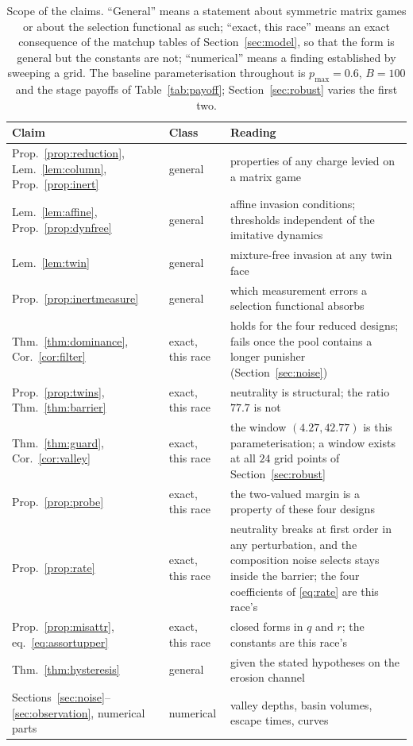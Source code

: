 \documentclass[pdflatex]{sn-jnl}
\theoremstyle{thmstyleone}
\theoremstyle{thmstylethree}
\theoremstyle{thmstyletwo}
\begin{document}
\begin{table}[!ht]
\centering
\caption{Scope of the claims. ``General'' means a statement about symmetric
matrix games or about the selection functional as such; ``exact, this race''
means an exact consequence of the matchup tables of Section~\ref{sec:model},
so that the form is general but the constants are not; ``numerical'' means a
finding established by sweeping a grid. The baseline parameterisation
throughout is $p_{\max}=0.6$, $B=100$ and the stage payoffs of
Table~\ref{tab:payoff}; Section~\ref{sec:robust} varies the first two.}
\label{tab:scope}
\begin{tabular}{llp{5.4cm}}
\toprule
Claim & Class & Reading \\
\midrule
Prop.~\ref{prop:reduction}, Lem.~\ref{lem:column}, Prop.~\ref{prop:inert}
  & general & properties of any charge levied on a matrix game \\
Lem.~\ref{lem:affine}, Prop.~\ref{prop:dynfree}
  & general & affine invasion conditions; thresholds independent of the
    imitative dynamics \\
Lem.~\ref{lem:twin}
  & general & mixture-free invasion at any twin face \\
Prop.~\ref{prop:inertmeasure}
  & general & which measurement errors a selection functional absorbs \\
Thm.~\ref{thm:dominance}, Cor.~\ref{cor:filter}
  & exact, this race & holds for the four reduced designs; fails once the pool
    contains a longer punisher (Section~\ref{sec:noise}) \\
Prop.~\ref{prop:twins}, Thm.~\ref{thm:barrier}
  & exact, this race & neutrality is structural; the ratio $77.7$ is not \\
Thm.~\ref{thm:guard}, Cor.~\ref{cor:valley}
  & exact, this race & the window $(4.27,42.77)$ is this parameterisation;
    a window exists at all $24$ grid points of Section~\ref{sec:robust} \\
Prop.~\ref{prop:probe}
  & exact, this race & the two-valued margin is a property of these four
    designs \\
Prop.~\ref{prop:rate}
  & exact, this race & neutrality breaks at first order in any
    perturbation, and the composition noise selects stays inside the
    barrier; the four coefficients of \eqref{eq:rate} are this race's \\
Prop.~\ref{prop:misattr}, eq.~\eqref{eq:assortupper}
  & exact, this race & closed forms in $q$ and $r$; the constants are
    this race's \\
Thm.~\ref{thm:hysteresis}
  & general & given the stated hypotheses on the erosion channel \\
Sections~\ref{sec:noise}--\ref{sec:observation}, numerical parts
  & numerical & valley depths, basin volumes, escape times, curves \\
\bottomrule
\end{tabular}
\end{table}
\end{document}
